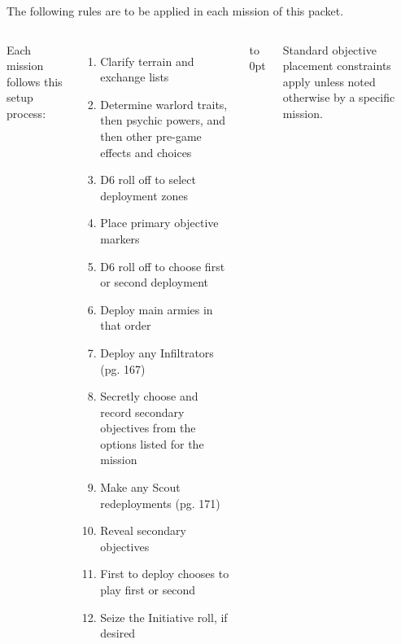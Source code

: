 \clearpage
{}

The following rules are to be applied in each mission of this packet.

\begin{columns}
  
Each mission follows this setup process:

\begin{enumerate}\shortlist
\item Clarify terrain and exchange lists

\item Determine warlord traits, then psychic powers, and then other
  pre-game effects and choices

\item D6 roll off to select deployment zones

\item Place primary objective markers

\item D6 roll off to choose first or second deployment

\item Deploy main armies in that order

\item Deploy any Infiltrators (pg. 167)

\item Secretly choose and record secondary objectives from the options
  listed for the mission

\item Make any Scout redeployments (pg. 171)

\item Reveal secondary objectives

\item First to deploy chooses to play first or second

\item Seize the Initiative roll, if desired

\end{enumerate}

\vfill\vbox to 0pt{}

\columnbreak
{}

Standard objective placement constraints apply unless noted otherwise
by a specific mission.


\end{columns}
